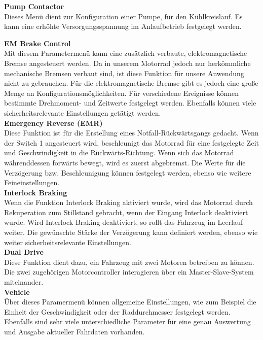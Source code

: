 \textbf{Pump Contactor}\\[1mm]
Dieses Menü dient zur Konfiguration einer Pumpe, für den Kühlkreislauf. Es kann eine erhöhte Versorgungsspannung im Anlaufbetrieb festgelegt werden.

\newpage

\textbf{EM Brake Control}\\[1mm]
Mit diesem Parametermenü kann eine zusätzlich verbaute, elektromagnetische Bremse angesteuert werden. Da in unserem Motorrad jedoch nur herkömmliche mechanische Bremsen verbaut sind, ist diese Funktion für unsere Anwendung nicht zu gebrauchen. Für die elektromagnetische Bremse gibt es jedoch eine große Menge an Konfigurationsmöglichkeiten. Für verschiedene Ereignisse können bestimmte Drehmoment- und Zeitwerte festgelegt werden. Ebenfalls können viele sicherheitsrelevante Einstellungen getätigt werden. 
\\[4mm]

\textbf{Emergency Reverse (EMR)}\\[1mm]
Diese Funktion ist für die Erstellung eines Notfall-Rückwärtsgangs gedacht. Wenn der Switch 1 angesteuert wird, beschleunigt das Motorrad für eine festgelegte Zeit und Geschwindigkeit in die Rückwärts-Richtung. Wenn sich das Motorrad währenddessen forwärts bewegt, wird es zuerst abgebremst. Die Werte für die Verzögerung bzw. Beschleunigung können festgelegt werden, ebenso wie weitere Feineinstellungen.
\\[4mm]

\textbf{Interlock Braking}\\[1mm]
Wenn die Funktion Interlock Braking aktiviert wurde, wird das Motorrad durch Rekuperation zum Stillstand gebracht, wenn der Eingang Interlock deaktiviert wurde. Wird Interlock Braking deaktiviert, so rollt das Fahrzeug im Leerlauf weiter. Die gewünschte Stärke der Verzögerung kann definiert werden, ebenso wie weiter sicherheitsrelevante Einstellungen.
\\[4mm]

\textbf{Dual Drive}\\[1mm]
Diese Funktion dient dazu, ein Fahrzeug mit zwei Motoren betreiben zu können. Die zwei zugehörigen Motorcontroller interagieren über ein Master-Slave-System miteinander.
\\[4mm]

\textbf{Vehicle}\\[1mm]
Über dieses Paramermenü können allgemeine Einstellungen, wie zum Beispiel die Einheit der Geschwindigkeit oder der Raddurchmesser festgelegt werden. Ebenfalls sind sehr viele unterschiedliche Parameter für eine genau Auswertung und Ausgabe aktueller Fahrdaten vorhanden.
\\[4mm]

